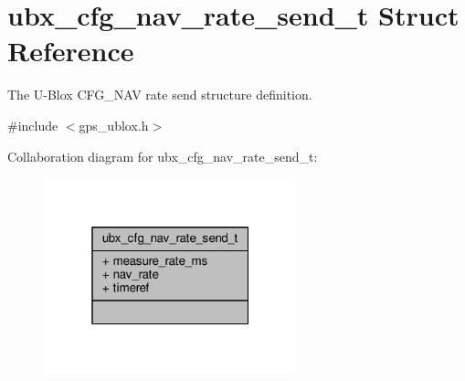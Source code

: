 \hypertarget{structubx__cfg__nav__rate__send__t}{\section{ubx\+\_\+cfg\+\_\+nav\+\_\+rate\+\_\+send\+\_\+t Struct Reference}
\label{structubx__cfg__nav__rate__send__t}
}


The U-\/\+Blox C\+F\+G\+\_\+\+N\+A\+V rate send structure definition.  




{\ttfamily \#include $<$gps\+\_\+ublox.\+h$>$}



Collaboration diagram for ubx\+\_\+cfg\+\_\+nav\+\_\+rate\+\_\+send\+\_\+t\+:
\nopagebreak
\begin{figure}[H]
\begin{center}
\leavevmode
\includegraphics[width=208pt]{structubx__cfg__nav__rate__send__t__coll__graph}
\end{center}
\end{figure}

